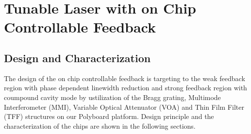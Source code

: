 \chapter{Tunable Laser with on Chip Controllable Feedback}\label{ch:laser_with_on_chip_feedback}
\section{Design and Characterization}\label{sec:design_and_characterization}
The design of the on chip controllable feedback is targeting to the weak feedback region with phase dependent linewidth reduction and strong feedback region with coumpound cavity mode by ustilization of the Bragg grating, Multimode Interferometer (MMI), Variable Optical Attenuator (VOA) and Thin Film Filter (TFF) structures on our Polyboard platform. Design principle and the characterization of the chips are shown in the following sections.


